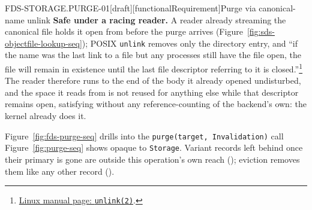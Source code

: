 \begin{requirement}{FDS-STORAGE.PURGE-01}[draft][functionalRequirement]{Purge via canonical-name unlink}
  \textbf{Safe under a racing reader.} A reader already streaming the
  canonical file holds it open from before the purge arrives
  (Figure~\ref{fig:sds-objectfile-lookup-seq}); POSIX \texttt{unlink}
  removes only the directory entry, and ``if the name was the last link to
  a file but any processes still have the file open, the file will remain
  in existence until the last file descriptor referring to it is
  closed.''\footnote{\href{https://man7.org/linux/man-pages/man2/unlink.2.html}{Linux
  manual page: \texttt{unlink(2)}}.} The reader therefore runs to the end
  of the body it already opened undisturbed, and the space it reads from is
  not reused for anything else while that descriptor remains open,
  satisfying 
  without any reference-counting of the backend's own: the kernel already
  does it.

  Figure~\ref{fig:fds-purge-seq} drills into the \texttt{purge(target,
  Invalidation)} call Figure~\ref{fig:purge-seq} shows opaque to
  \texttt{Storage}. Variant records left behind once their primary is gone
  are outside this operation's own reach ();
  eviction removes them like any other record
  ().


\end{requirement}
